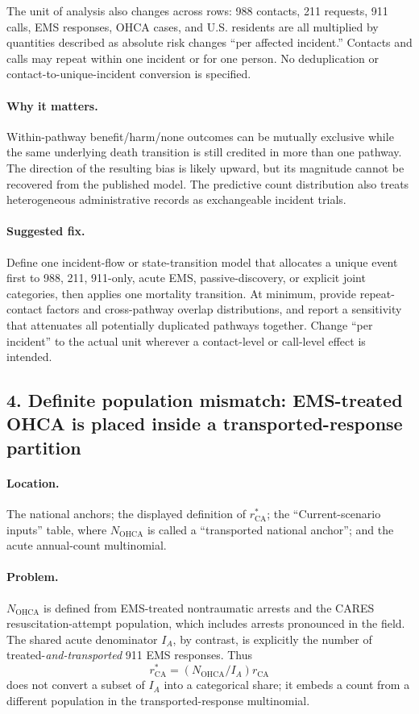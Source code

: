 \documentclass[11pt]{article}
\begin{document}
The unit of analysis also changes across rows: 988 contacts, 211 requests,
911 calls, EMS responses, OHCA cases, and U.S. residents are all multiplied by
quantities described as absolute risk changes ``per affected incident.''
Contacts and calls may repeat within one incident or for one person.  No
deduplication or contact-to-unique-incident conversion is specified.

\paragraph{Why it matters.}
Within-pathway benefit/harm/none outcomes can be mutually exclusive while the
same underlying death transition is still credited in more than one pathway.
The direction of the resulting bias is likely upward, but its magnitude cannot
be recovered from the published model.  The predictive count distribution
also treats heterogeneous administrative records as exchangeable incident
trials.

\paragraph{Suggested fix.}
Define one incident-flow or state-transition model that allocates a unique
event first to 988, 211, 911-only, acute EMS, passive-discovery, or explicit
joint categories, then applies one mortality transition.  At minimum, provide
repeat-contact factors and cross-pathway overlap distributions, and report a
sensitivity that attenuates all potentially duplicated pathways together.
Change ``per incident'' to the actual unit wherever a contact-level or
call-level effect is intended.

\subsection*{4. Definite population mismatch: EMS-treated OHCA is placed inside a transported-response partition}

\paragraph{Location.}
The national anchors; the displayed definition of $r^*_{\mathrm{CA}}$; the
``Current-scenario inputs'' table, where $N_{\mathrm{OHCA}}$ is called a
``transported national anchor''; and the acute annual-count multinomial.

\paragraph{Problem.}
$N_{\mathrm{OHCA}}$ is defined from EMS-treated nontraumatic arrests and the
CARES resuscitation-attempt population, which includes arrests pronounced in
the field.  The shared acute denominator $I_A$, by contrast, is explicitly the
number of treated-\emph{and-transported} 911 EMS responses.  Thus
\[
r^*_{\mathrm{CA}}=(N_{\mathrm{OHCA}}/I_A)r_{\mathrm{CA}}
\]
does not convert a subset of $I_A$ into a categorical share; it embeds a count
from a different population in the transported-response multinomial.
\end{document}
